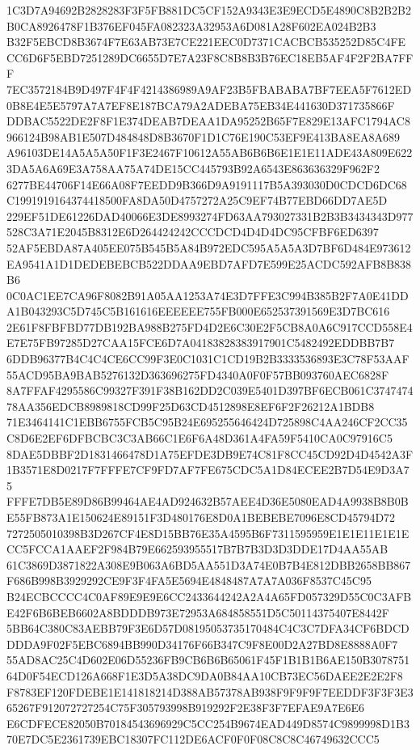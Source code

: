 \documentclass[UTF8,fontset=fandol,zihao=-4,a4paper]{ctexart}
\begin{document}
{{1C3D7A94692B2828283F3F5FB881DC5CF152A9343E3E9ECD5E4890C8B2B2B2B0CA8926478F1B376EF045FA082323A32953A6D081A28F602EA024B2B3
B32F5EBCD8B3674F7E63AB73E7CE221EEC0D7371CACBCB535252D85C4FECC6D6F5EBD7251289DC6655D7E7A23F8C8B8B3B76EC18EB5AF4F2F2BA7FFF
7EC3572184B9D497F4F4F4214386989A9AF23B5FBABABA7BF7EEA5F7612ED0B8E4E5E5797A7A7EF8E187BCA79A2ADEBA75EB34E441630D371735866F
DDBAC5522DE2F8F1E374DEAB7DEAA1DA95252B65F7E829E13AFC1794AC8966124B98AB1E507D484848D8B3670F1D1C76E190C53EF9E413BA8EA8A689
A96103DE14A5A5A50F1F3E2467F10612A55AB6B6B6E1E1E11ADE43A809E6223DA5A6A69E3A758AA75A74DE15CC445793B92A6543E863636329F962F2
6277BE44706F14E66A08F7EEDD9B366D9A9191117B5A393030D0CDCD6DC68C1991919164374418500FA8DA50D4757272A25C9EF74B77EBD66DD7AE5D
229EF51DE61226DAD40066E3DE8993274FD63AA793027331B2B3B3434343D977528C3A71E2045B8312E6D264424242CCCDCD4D4D4DC95CFBF6ED6397
52AF5EBDA87A405EE075B545B5A84B972EDC595A5A5A3D7BF6D484E973612EA9541A1D1DEDEBEBCB522DDAA9EBD7AFD7E599E25ACDC592AFB8B838B6
0C0AC1EE7CA96F8082B91A05AA1253A74E3D7FFE3C994B385B2F7A0E41DDA1B043293C5D745C5B161616EEEEEE755FB000E652537391569E3D7BC616
2E61F8FBFBD77DB192BA988B275FD4D2E6C30E2F5CB8A0A6C917CCD558E4E7E75FB97285D27CAA15FCE6D7A04183828383917901C5482492EDDBB7B7
6DDB96377B4C4C4CE6CC99F3E0C1031C1CD19B2B3333536893E3C78F53AAF55ACD95BA9BAB5276132D363696275FD4340A0F0F57BB093760AEC6828F
8A7FFAF4295586C99327F391F38B162DD2C039E5401D397BF6ECB061C374747478AA356EDCB8989818CD99F25D63CD4512898E8EF6F2F26212A1BDB8
71E3464141C1EBB6755FCB5C95B24E695255646424D725898C4AA246CF2CC35C8D6E2EF6DFBCBC3C3AB66C1E6F6A48D361A4FA59F5410CA0C97916C5
8DAE5DBBF2D1831466478D1A75EFDE3DB9E74C81F8CC45CD92D4D4542A3F1B3571E8D0217F7FFFE7CF9FD7AF7FE675CDC5A1D84ECEE2B7D54E9D3A75
FFFE7DB5E89D86B99464AE4AD924632B57AEE4D36E5080EAD4A9938B8B0BE55FB873A1E150624E89151F3D480176E8D0A1BEBEBE7096E8CD45794D72
7272505010398B3D267CF4E8D15BB76E35A4595B6F7311595959E1E1E11E1E1ECC5FCCA1AAEF2F984B79E662593955517B7B7B3D3D3DDE17D4AA55AB
61C3869D3871822A308E9B063A6BD5AA551D3A74E0B7B4E812DBB2658BB867F686B998B3929292CE9F3F4FA5E5694E4848487A7A7A036F8537C45C95
B24ECBCCCC4C0AF89E9E9E6CC2433644242A2A4A65FD057329D55C0C3AFBE42F6B6BEB6602A8BDDDB973E72953A684858551D5C50114375407E8442F
5BB64C380C83AEBB79F3E6D57D08195053735170484C4C3C7DFA34CF6BDCDDDDA9F02F5EBC6894BB990D34176F66B347C9F8E00D2A27BD8E8888A0F7
55AD8AC25C4D602E06D55236FB9CB6B6B65061F45F1B1B1B6AE150B307875164D0F54ECD126A668F1E3D5A38DC9DA0B84AA10CB73EC56DAEE2E2E2F8
F8783EF120FDEBE1E141818214D388AB57378AB938F9F9F9F7EEDDF3F3F3E365267F912072727254C75F305793998B919292F2E38F3F7EFAE9A7E6E6
E6CDFECE82050B70184543696929C5CC254B9674EAD449D8574C9899998D1B370E7DC5E2361739EBC18307FC112DE6ACF0F0F08C8C8C46749632CCC5
}}
\end{document}
